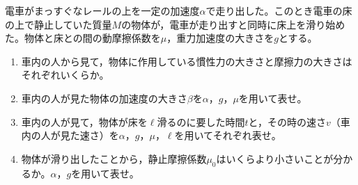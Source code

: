 \item 電車がまっすぐなレールの上を一定の加速度$\alpha$で走り出した。このとき電車の床の上で静止していた質量$M$の物体が，電車が走り出すと同時に床上を滑り始めた。物体と床との間の動摩擦係数を$\mu $，重力加速度の大きさを$g$とする。
    \begin{enumerate}
        \item 車内の人から見て，物体に作用している慣性力の大きさと摩擦力の大きさはそれぞれいくらか。
        \item 車内の人が見た物体の加速度の大きさ$\beta $を$\alpha $，$g$，$\mu $を用いて表せ。
        \item 車内の人が見て，物体が床を$\ell $滑るのに要した時間$t$と，その時の速さ$v$（車内の人が見た速さ）を$\alpha $，$g$，$\mu $，$\ell $を用いてそれぞれ表せ。
        \item 物体が滑り出したことから，静止摩擦係数$\mu _0$はいくらより小さいことが分かるか。$\alpha $，$g$を用いて表せ。
    \end{enumerate}